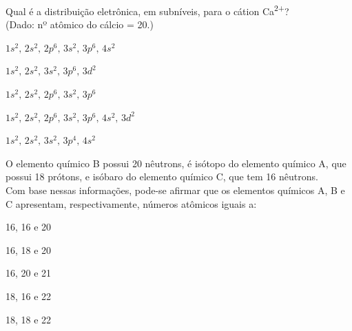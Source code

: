 \questao %
Qual é a distribuição eletrônica, em subníveis, para o cátion Ca\textsuperscript{2+}?\\
(Dado: nº atômico do cálcio = 20.)
\begin{alternativas}
\item $1s^2, \, 2s^2, \, 2p^6, \, 3s^2, \, 3p^6, \, 4s^2$
\item $1s^2, \, 2s^2,\, 3s^2, \, 3p^6, \, 3d^2$
\item $1s^2, \, 2s^2,\, 2p^6, \, 3s^2, \, 3p^6$
\item $1s^2, \, 2s^2,\, 2p^6, \, 3s^2, \, 3p^6, \, 4s^2, \, 3d^2$
\item $1s^2, \, 2s^2,\, 3s^2, \, 3p^4, \, 4s^2$
\end{alternativas}

\questao %
O elemento químico B possui 20 nêutrons, é isótopo do elemento químico A, que possui 18 prótons, e isóbaro do elemento químico C, que tem 16 nêutrons. \\
Com base nessas informações, pode-se afirmar que os elementos químicos A, B e C apresentam, respectivamente, números atômicos iguais a:
\begin{alternativas}
\item 16, 16 e 20 
\item 16, 18 e 20 
\item 16, 20 e 21
\item 18, 16 e 22 
\item 18, 18 e 22
\end{alternativas}

